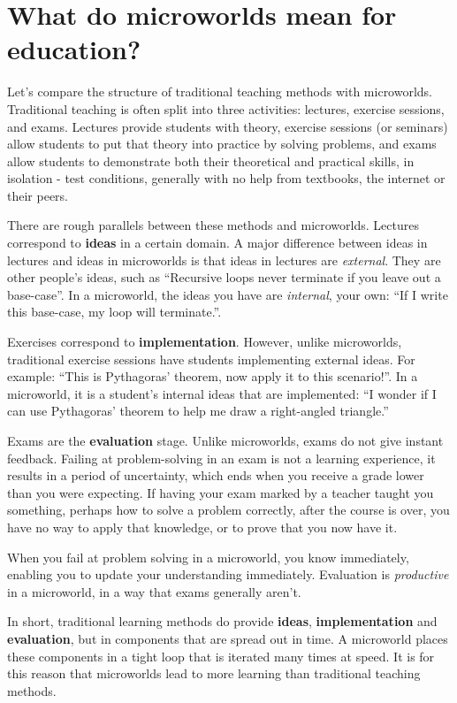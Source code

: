 \section{What do microworlds mean for education?}

Let's compare the structure of traditional teaching methods with
microworlds. Traditional teaching is often split into three activities:
lectures, exercise sessions, and exams. Lectures provide students with
theory, exercise sessions (or seminars) allow students to put that
theory into practice by solving problems, and exams allow students to
demonstrate both their theoretical and practical skills, in isolation -
test conditions, generally with no help from textbooks, the internet or
their peers.

There are rough parallels between these methods and microworlds.
Lectures correspond to \textbf{ideas} in a certain domain. A major
difference between ideas in lectures and ideas in microworlds is that
ideas in lectures are \emph{external}. They are other people's ideas,
such as ``Recursive loops never terminate if you leave out a
base-case''. In a microworld, the ideas you have are \emph{internal},
your own: ``If I write this base-case, my loop will terminate.''.

Exercises correspond to \textbf{implementation}. However, unlike
microworlds, traditional exercise sessions have students implementing
external ideas. For example: ``This is Pythagoras' theorem, now apply it
to this scenario!''. In a microworld, it is a student's internal ideas
that are implemented: ``I wonder if I can use Pythagoras' theorem to
help me draw a right-angled triangle.''

Exams are the \textbf{evaluation} stage. Unlike microworlds, exams do
not give instant feedback. Failing at problem-solving in an exam is not
a learning experience, it results in a period of uncertainty, which ends
when you receive a grade lower than you were expecting. If having your exam marked by a teacher
taught you something, perhaps how to solve a problem correctly, after
the course is over, you have no way to apply that knowledge, or to prove
that you now have it.

When you fail at problem solving in a microworld, you know immediately,
enabling you to update your understanding immediately. Evaluation is
\emph{productive} in a microworld, in a way that exams generally aren't.

In short, traditional learning methods do provide \textbf{ideas},
\textbf{implementation} and \textbf{evaluation}, but in components that
are spread out in time. A microworld places these components in a tight
loop that is iterated many times at speed. It is for this reason that
microworlds lead to more learning than traditional teaching methods.

